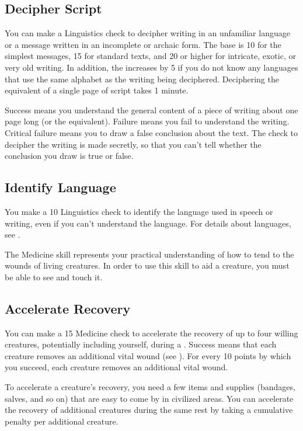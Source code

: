     \subsection{Decipher Script}
        You can make a Linguistics check to decipher writing in an unfamiliar language or a message written in an incomplete or archaic form. The base  is 10 for the simplest messages, 15 for standard texts, and 20 or higher for intricate, exotic, or very old writing. In addition, the  increases by 5 if you do not know any languages that use the same alphabet as the writing being deciphered. Deciphering the equivalent of a single page of script takes 1 minute.

        Success means you understand the general content of a piece of writing about one page long (or the equivalent). Failure means you fail to understand the writing. Critical failure means you to draw a false conclusion about the text. The check to decipher the writing is made secretly, so that you can't tell whether the conclusion you draw is true or false.

    \subsection{Identify Language}
        You make a  10 Linguistics check to identify the language used in speech or writing, even if you can't understand the language.
        For details about languages, see .

\newpage
{}
    The Medicine skill represents your practical understanding of how to tend to the wounds of living creatures.
    In order to use this skill to aid a creature, you must be able to see and touch it.

    \subsection{Accelerate Recovery}\label{Accelerate Recovery}
        You can make a  15 Medicine check to accelerate the recovery of up to four willing creatures, potentially including yourself, during a .
        Success means that each creature removes an additional vital wound (see ).
        For every 10 points by which you succeed, each creature removes an additional vital wound.

        To accelerate a creature's recovery, you need a few items and supplies (bandages, salves, and so on) that are easy to come by in civilized areas.
        You can accelerate the recovery of additional creatures during the same rest by taking a cumulative  penalty per additional creature.

